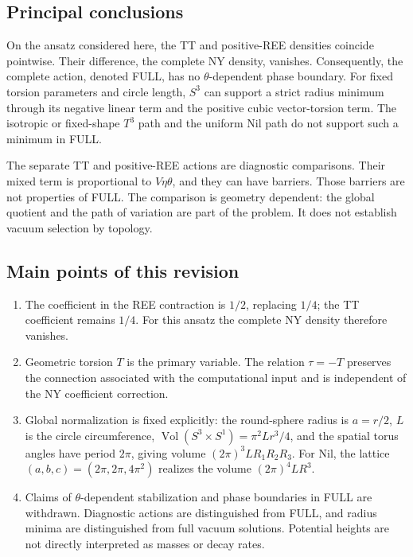 \subsection{Principal conclusions}
On the ansatz considered here, the TT and positive-REE densities coincide
pointwise. Their difference, the complete NY density, vanishes.
Consequently, the complete action, denoted FULL, has no $\theta$-dependent
phase boundary. For fixed torsion parameters and circle length,
$S^3$ can support a strict radius minimum through its negative linear
term and the positive cubic vector-torsion term. The isotropic or
fixed-shape $T^3$ path and the uniform Nil path do not support such a
minimum in FULL.

The separate TT and positive-REE actions are diagnostic comparisons.
Their mixed term is proportional to $V\eta\theta$, and they can have
barriers. Those barriers are not properties of FULL. The comparison is
geometry dependent: the global quotient and the path of variation are
part of the problem. It does not establish vacuum selection by topology.

\subsection{Main points of this revision}
\begin{enumerate}
\item The coefficient in the REE contraction is $1/2$, replacing $1/4$;
the TT coefficient remains $1/4$. For this ansatz the complete NY density
therefore vanishes.
\item Geometric torsion $T$ is the primary variable. The relation
$\tau=-T$ preserves the connection associated with the computational
input and is independent of the NY coefficient correction.
\item Global normalization is fixed explicitly: the round-sphere radius
is $a=r/2$, $L$ is the circle circumference,
$\operatorname{Vol}(S^3\times S^1)=\pi^2Lr^3/4$, and the spatial torus
angles have period $2\pi$, giving volume $(2\pi)^3LR_1R_2R_3$.
For Nil, the lattice $(a,b,c)=(2\pi,2\pi,4\pi^2)$ realizes the volume
$(2\pi)^4LR^3$.
\item Claims of $\theta$-dependent stabilization and phase boundaries in
FULL are withdrawn. Diagnostic actions are distinguished from FULL,
and radius minima are distinguished from full vacuum solutions.
Potential heights are not directly interpreted as masses or decay rates.
\end{enumerate}

